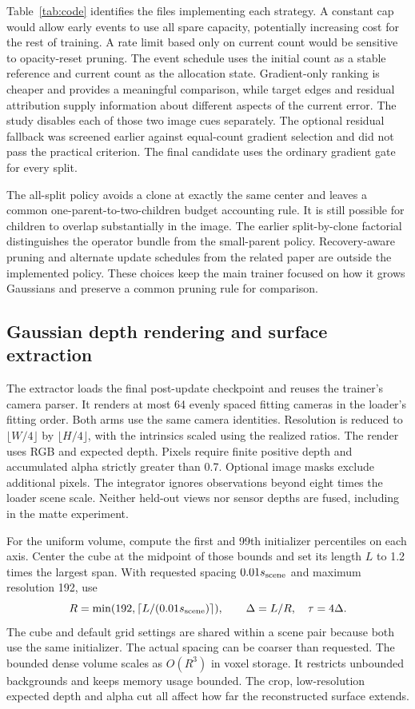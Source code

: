 Table~\ref{tab:code} identifies the files implementing each strategy. A constant cap would allow early events to use all spare capacity, potentially increasing cost for the rest of training. A rate limit based only on current count would be sensitive to opacity-reset pruning. The event schedule uses the initial count as a stable reference and current count as the allocation state. Gradient-only ranking is cheaper and provides a meaningful comparison, while target edges and residual attribution supply information about different aspects of the current error. The study disables each of those two image cues separately. The optional residual fallback was screened earlier against equal-count gradient selection and did not pass the practical criterion. The final candidate uses the ordinary gradient gate for every split.

The all-split policy avoids a clone at exactly the same center and leaves a common one-parent-to-two-children budget accounting rule. It is still possible for children to overlap substantially in the image. The earlier split-by-clone factorial distinguishes the operator bundle from the small-parent policy. Recovery-aware pruning and alternate update schedules from the related paper are outside the implemented policy. These choices keep the main trainer focused on how it grows Gaussians and preserve a common pruning rule for comparison.

\subsection{Gaussian depth rendering and surface extraction}
The extractor loads the final post-update checkpoint and reuses the trainer's camera parser. It renders at most 64 evenly spaced fitting cameras in the loader's fitting order. Both arms use the same camera identities. Resolution is reduced to $\lfloor W/4\rfloor$ by $\lfloor H/4\rfloor$, with the intrinsics scaled using the realized ratios. The render uses RGB and expected depth. Pixels require finite positive depth and accumulated alpha strictly greater than 0.7. Optional image masks exclude additional pixels. The integrator ignores observations beyond eight times the loader scene scale. Neither held-out views nor sensor depths are fused, including in the matte experiment.

For the uniform volume, compute the first and 99th initializer percentiles on each axis. Center the cube at the midpoint of those bounds and set its length $L$ to 1.2 times the largest span. With requested spacing $0.01s_{\rm scene}$ and maximum resolution 192, use
\begin{equation}
 R=\min(192,\lceil L/(0.01s_{\rm scene})\rceil),\qquad
 \Delta=L/R,\quad \tau=4\Delta.
\end{equation}
The cube and default grid settings are shared within a scene pair because both use the same initializer. The actual spacing can be coarser than requested. The bounded dense volume scales as $O(R^3)$ in voxel storage. It restricts unbounded backgrounds and keeps memory usage bounded. The crop, low-resolution expected depth and alpha cut all affect how far the reconstructed surface extends.

